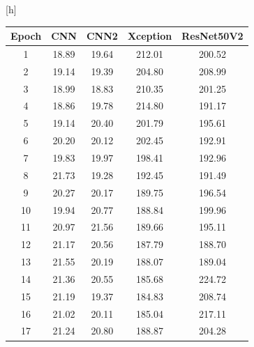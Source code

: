 \begin{center}[h]
	\begin{table}[htbp]
	\centering
	\label{tab:training_time}
	\begin{tabular}{|c|c|c|c|c|}
	\hline
	Epoch & CNN & CNN2 & Xception & ResNet50V2 \\
	\hline
	1              & 18.89        & 19.64         & 212.01            & 200.52              \\
	2              & 19.14        & 19.39         & 204.80            & 208.99              \\
	3              & 18.99        & 18.83         & 210.35            & 201.25              \\
	4              & 18.86        & 19.78         & 214.80            & 191.17              \\
	5              & 19.14        & 20.40         & 201.79            & 195.61              \\
	6              & 20.20        & 20.12         & 202.45            & 192.91              \\
	7              & 19.83        & 19.97         & 198.41            & 192.96              \\
	8              & 21.73        & 19.28         & 192.45            & 191.49              \\
	9              & 20.27        & 20.17         & 189.75            & 196.54              \\
	10             & 19.94        & 20.77         & 188.84            & 199.96              \\
	11             & 20.97        & 21.56         & 189.66            & 195.11              \\
	12             & 21.17        & 20.56         & 187.79            & 188.70              \\
	13             & 21.55        & 20.19         & 188.07            & 189.04              \\
	14             & 21.36        & 20.55         & 185.68            & 224.72              \\
	15             & 21.19        & 19.37         & 184.83            & 208.74              \\
	16             & 21.02        & 20.11         & 185.04            & 217.11              \\
	17             & 21.24        & 20.80         & 188.87            & 204.28              \\

\end{tabular}
\end{table}
\end{center}
